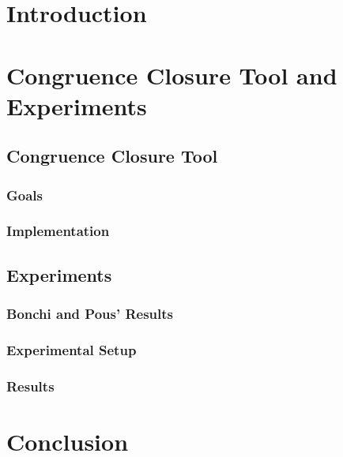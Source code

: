 
\chapter{Introduction}



\chapter{Congruence Closure Tool and Experiments}

\section{Congruence Closure Tool}

\subsection{Goals}

\subsection{Implementation}

\section{Experiments}

\subsection{Bonchi and Pous' Results}

\subsection{Experimental Setup}

\subsection{Results}

\chapter{Conclusion}
